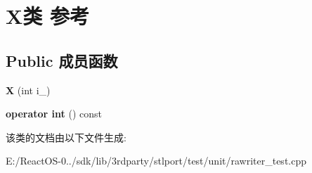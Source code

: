 \hypertarget{class_x}{}\section{X类 参考}
\label{class_x}
\subsection*{Public 成员函数}
\begin{DoxyCompactItemize}
\item 
\mbox{\label{class_x_ab7edfb9445572918cce30d064ada0c59}} 
{\bfseries X} (int i\+\_)
\item 
\mbox{\label{class_x_a1eab048763ace5957469c4fbafbbc5fd}} 
{\bfseries operator int} () const
\end{DoxyCompactItemize}


该类的文档由以下文件生成\+:\begin{DoxyCompactItemize}
\item 
E\+:/\+React\+O\+S-\/0../sdk/lib/3rdparty/stlport/test/unit/rawriter\+\_\+test.\+cpp\end{DoxyCompactItemize}

